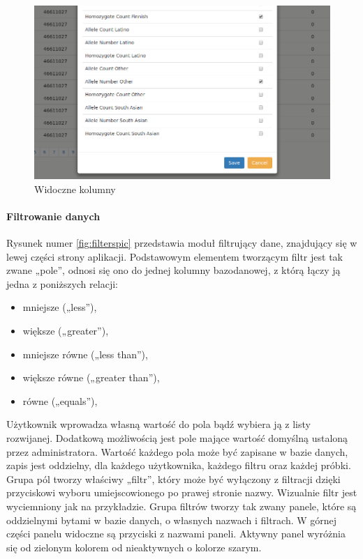 \documentclass[a4paper,12pt,twoside]{article}
\begin{document}
\begin{figure}[h]
\includegraphics[width=\linewidth]{obrazy/aplikacja/visible_columns.png}
\caption{Widoczne kolumny}
\label{fig:visible_columnspic}
\end{figure}

\newpage
\paragraph{Filtrowanie danych}
Rysunek numer \ref{fig:filterspic} przedstawia moduł filtrujący dane, znajdujący się w
lewej części strony aplikacji.
Podstawowym elementem tworzącym filtr jest tak zwane „pole”, odnosi się ono do jednej kolumny
bazodanowej, z którą łączy ją jedna z poniższych relacji:

\begin{itemize}
\item mniejsze („less”),
\item większe („greater”),
\item mniejsze równe („less than”),
\item większe równe („greater than”),
\item równe („equals”),
\end{itemize}

Użytkownik wprowadza własną wartość do pola bądź wybiera ją z listy rozwijanej.
Dodatkową możliwością jest pole mające wartość domyślną ustaloną przez administratora.
Wartość każdego pola może być zapisane w bazie danych, zapis jest oddzielny, dla każdego
użytkownika, każdego filtru oraz każdej próbki.
Grupa pól tworzy właściwy „filtr”, który może być wyłączony z filtracji dzięki
przyciskowi wyboru umiejscowionego po prawej stronie nazwy. Wizualnie filtr jest wyciemniony jak na przykładzie.
Grupa filtrów tworzy tak zwany panele, które są oddzielnymi bytami w bazie danych, o własnych nazwach i filtrach.
W górnej części panelu widoczne są przyciski z nazwami paneli. Aktywny panel
wyróżnia się od zielonym kolorem od nieaktywnych o kolorze szarym.
\end{document}
